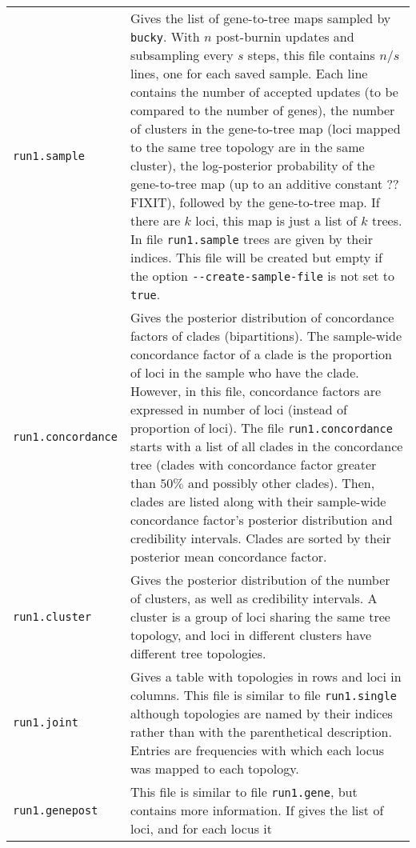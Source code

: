 \documentclass[12pt,english,final,letterpaper]{article}
\begin{document}
\hspace*{-1in}
\begin{tabular}{l|p{5.5in}}
{\tt run1.sample}& Gives the list of gene-to-tree maps sampled by 
{\tt bucky}. With $n$ post-burnin updates and subsampling every $s$ steps, 
this file contains $n/s$ lines, one for each saved sample. Each line contains 
the number of accepted updates (to be compared to the number of genes), 
the number of clusters in the gene-to-tree map (loci mapped to the same 
tree topology are in the same cluster), 
the log-posterior probability of the gene-to-tree map 
(up to an additive constant ??FIXIT), 
followed by the gene-to-tree map. If there are $k$ loci, this map is just 
a list of $k$ trees. In file {\tt run1.sample} trees are given by their 
indices. This file will be created but empty if the option 
\verb+--create-sample-file+ is not set to {\tt true}.\\
{\tt run1.concordance}&Gives the posterior distribution of concordance
factors of clades (bipartitions). The sample-wide concordance factor of a 
clade is the proportion of loci in the sample who have the clade. However, in 
this file, concordance factors are expressed in number of loci (instead of 
proportion of loci). The file {\tt run1.concordance} starts with a list 
of all clades in the concordance tree (clades with concordance factor 
greater than $50\%$ and possibly other clades).
Then, clades are listed along with their sample-wide concordance factor's 
posterior distribution and credibility intervals. Clades are sorted by their 
posterior mean concordance factor.\\
{\tt run1.cluster}&Gives the posterior distribution of the number of 
clusters, as well as credibility intervals. A cluster is a group of loci 
sharing the same tree topology, and loci in different clusters have different 
tree topologies.\\
%
{\tt run1.joint}&Gives a table with topologies in rows and loci in columns.
This file is similar to file {\tt run1.single} although topologies are 
named by their indices rather than with the parenthetical description. 
Entries are frequencies with which each locus was mapped to each topology.\\ 
{\tt run1.genepost}&This file is similar to file {\tt run1.gene}, but 
contains more information. If gives the list of loci, and for each locus it 

\end{tabular}
\end{document}
